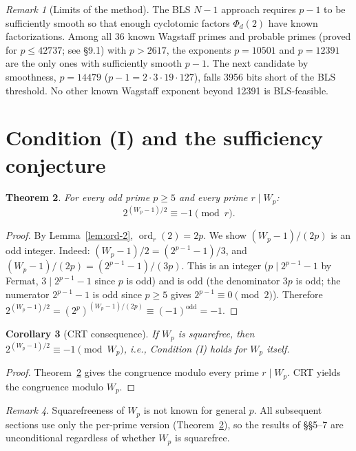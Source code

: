 \documentclass[12pt]{article}
\theoremstyle{plain}
\newtheorem{theorem}{Theorem}[section]
\newtheorem{corollary}[theorem]{Corollary}
\theoremstyle{definition}
\theoremstyle{remark}
\newtheorem{remark}[theorem]{Remark}
\begin{document}
\begin{remark}[Limits of the method]\label{rem:bls-ceiling}
The BLS \(N-1\) approach
requires \(p - 1\) to be sufficiently smooth so that enough
cyclotomic factors \(\Phi_d(2)\) have known factorizations.
Among all 36 known Wagstaff primes and probable primes
(proved for \(p \leq 42737\); see \S9.1) with \(p > 2617\), the exponents \(p = 10501\) and \(p = 12391\) are
the only ones with sufficiently smooth \(p - 1\). The next candidate
by smoothness, \(p = 14479\) (\(p - 1 = 2 \cdot 3 \cdot 19 \cdot 127\)),
falls 3956 bits short of the BLS threshold. No other known Wagstaff
exponent beyond 12391 is BLS-feasible.
\end{remark}



\section{Condition (I) and the sufficiency conjecture}


\begin{theorem}\label{thm:cond-I}
For every odd prime \(p \geq 5\) and every prime
\(r \mid W_p\):
\[
2^{(W_p-1)/2} \equiv -1 \pmod{r}.
\]
\end{theorem}


\begin{proof}
By Lemma~\ref{lem:ord-2}, \(\operatorname{ord}_r(2) = 2p\). We show
\((W_p - 1)/(2p)\) is an odd integer. Indeed:
\((W_p - 1)/2 = (2^{p-1} - 1)/3\), and
\((W_p - 1)/(2p) = (2^{p-1} - 1)/(3p)\).
This is an integer (\(p \mid 2^{p-1}-1\) by Fermat, \(3 \mid 2^{p-1}-1\)
since \(p\) is odd) and is odd (the denominator \(3p\) is odd;
the numerator \(2^{p-1}-1\) is odd since \(p \geq 5\) gives
\(2^{p-1} \equiv 0 \pmod{2}\)).
Therefore \(2^{(W_p-1)/2} = (2^p)^{(W_p-1)/(2p)} \equiv (-1)^{\text{odd}}
= -1\).\end{proof}


\begin{corollary}[CRT consequence]\label{cor:cond-I-crt}
If \(W_p\) is squarefree, then
\(2^{(W_p-1)/2} \equiv -1 \pmod{W_p}\), i.e., Condition (I) holds
for \(W_p\) itself.
\end{corollary}


\begin{proof}
Theorem~\ref{thm:cond-I} gives the congruence modulo every prime
\(r \mid W_p\). CRT yields the congruence modulo \(W_p\).\end{proof}


\begin{remark}
Squarefreeness of \(W_p\) is not known for general \(p\). All
subsequent sections use only the per-prime version
(Theorem~\ref{thm:cond-I}), so the results of \S\S5--7 are
unconditional regardless of whether \(W_p\) is squarefree.
\end{remark}
\end{document}
